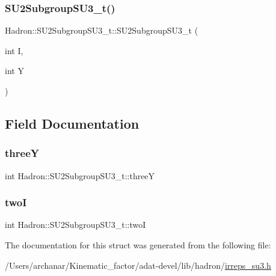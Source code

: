 \mbox{\label{structHadron_1_1SU2SubgroupSU3__t_a26fbf2f4603e560c703931e13d5e0af5}} 
\subsubsection{\texorpdfstring{SU2SubgroupSU3\_t()}{SU2SubgroupSU3\_t()}\hspace{0.1cm}{\footnotesize\ttfamily [6/6]}}
{\footnotesize\ttfamily Hadron\+::\+S\+U2\+Subgroup\+S\+U3\+\_\+t\+::\+S\+U2\+Subgroup\+S\+U3\+\_\+t (\begin{DoxyParamCaption}\item[{int}]{I,  }\item[{int}]{Y }\end{DoxyParamCaption})\hspace{0.3cm}{\ttfamily [inline]}}



\subsection{Field Documentation}
\mbox{\label{structHadron_1_1SU2SubgroupSU3__t_aee956c5cda78da686316083413d70bec}} 
\subsubsection{\texorpdfstring{threeY}{threeY}}
{\footnotesize\ttfamily int Hadron\+::\+S\+U2\+Subgroup\+S\+U3\+\_\+t\+::threeY}

\mbox{\label{structHadron_1_1SU2SubgroupSU3__t_a545b54ec733cee39969e152dd9b18c3f}} 
\subsubsection{\texorpdfstring{twoI}{twoI}}
{\footnotesize\ttfamily int Hadron\+::\+S\+U2\+Subgroup\+S\+U3\+\_\+t\+::twoI}



The documentation for this struct was generated from the following file\+:\begin{DoxyCompactItemize}
\item 
/\+Users/archanar/\+Kinematic\+\_\+factor/adat-\/devel/lib/hadron/\mbox{\hyperlink{adat-devel_2lib_2hadron_2irreps__su3_8h}{irreps\+\_\+su3.\+h}}\end{DoxyCompactItemize}
